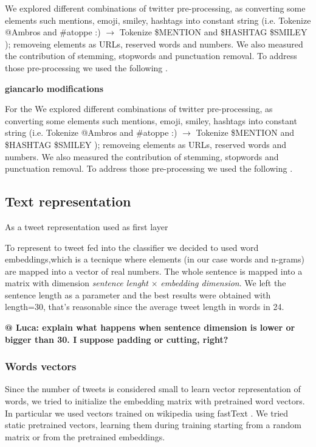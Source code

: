 We explored different combinations of twitter pre-processing, as converting some elements such mentions, emoji, smiley, hashtags into constant string (i.e. Tokenize @Ambros and \#atoppe :) $\rightarrow $ Tokenize \$MENTION and \$HASHTAG \$SMILEY ); removeing elements as URLs, reserved words and numbers.
We also measured the contribution of stemming, stopwords and punctuation removal.
To address those pre-processing we used the following \cite{nltk} \cite{tweets-preprocessor}.

\textbf{giancarlo modifications}


For the We explored different combinations of twitter pre-processing, as converting some elements such mentions, emoji, smiley, hashtags into constant string (i.e. Tokenize @Ambros and \#atoppe :) $\rightarrow $ Tokenize \$MENTION and \$HASHTAG \$SMILEY ); removeing elements as URLs, reserved words and numbers.
We also measured the contribution of stemming, stopwords and punctuation removal.
To address those pre-processing we used the following \cite{nltk} \cite{tweets-preprocessor}.

\subsection{Text representation} \label{subsec:representation}
As a tweet representation used as first layer

To represent to tweet fed into the classifier we decided to used word embeddings,which is a tecnique where elements (in our case words and n-grams) are mapped into a vector of real numbers.
The whole sentence is mapped into a matrix with dimension \emph{sentence lenght} $\times$ \emph{embedding dimension}.
We left the sentence length as a parameter and the best results were obtained with length=30, that's reasonable since the average tweet length in words in 24.

\textbf{@ Luca: explain what happens when sentence dimension is lower or bigger than 30. I suppose padding or cutting, right?}

\subsubsection{Words vectors}
Since the number of tweets is considered small to learn vector representation of words, we tried to initialize the embedding matrix with pretrained word vectors.
In particular we used vectors trained on wikipedia using fastText \cite{bojanowski2016enriching}.
We tried static pretrained vectors, learning them during training starting from a random matrix or from the pretrained embeddings.

